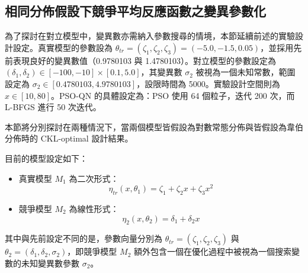 \subsection{相同分佈假設下競爭平均反應函數之變異參數化}

\hspace*{8mm} 為了探討在對立模型中，變異數亦需納入參數搜尋的情境，本節延續前述的實驗設計設定。真實模型的參數設為 $\theta_{tr} = (\zeta_1, \zeta_2, \zeta_3) = (-5.0, -1.5, 0.05)$，並採用先前表現良好的變異數值（0.9780103 與 1.4780103）。對立模型的參數設定為 $(\delta_1, \delta_2) \in [-100, -10] \times [0.1, 5.0]$，其變異數 $\sigma_2$ 被視為一個未知常數，範圍設定為 $\sigma_2 \in [0.4780103, 4.9780103]$，設限時間為 5000。實驗設計空間則為 $x \in [10, 80]$。PSO-QN 的具體設定為：PSO 使用 64 個粒子，迭代 200 次，而 L-BFGS 進行 50 次迭代。

\hspace*{8mm} 本節將分別探討在兩種情況下，當兩個模型皆假設為對數常態分佈與皆假設為韋伯分佈時的 CKL-optimal 設計結果。

目前的模型設定如下：

\begin{itemize}
\item 真實模型 $M_1$ 為二次形式：
\begin{equation}
\eta_{tr}(x,\theta_1)=\zeta_1+\zeta_2x+\zeta_3x^2
\end{equation}

\item 競爭模型 $M_2$ 為線性形式：
\begin{equation}
\eta_{2}(x,\theta_2)=\delta_1+\delta_2x
\end{equation}

\end{itemize}

\hspace*{8mm} 其中與先前設定不同的是，參數向量分別為 $\theta_{tr}=(\zeta_1,\zeta_2,\zeta_3)$ 與 $\theta_2=(\delta_1,\delta_2,\sigma_2)$，即競爭模型 $M_2$ 額外包含一個在優化過程中被視為一個搜索變數的未知變異數參數 $\sigma_2$。

